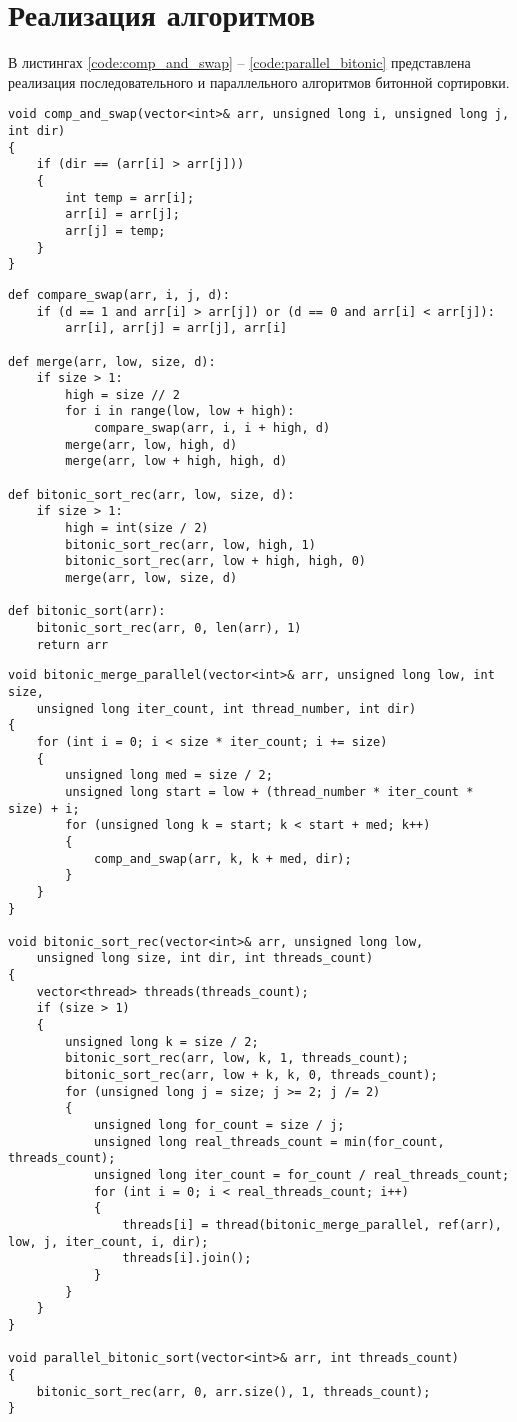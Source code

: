 \section{Реализация алгоритмов}

В листингах \ref{code:comp_and_swap} -- \ref{code:parallel_bitonic} представлена реализация последовательного и параллельного алгоритмов битонной сортировки.

\begin{lstlisting}[label=code:comp_and_swap,caption=Реализация вспомогательной функции обмена значениями элементов в массиве]
void comp_and_swap(vector<int>& arr, unsigned long i, unsigned long j, 
int dir)
{
	if (dir == (arr[i] > arr[j]))
	{
		int temp = arr[i];
		arr[i] = arr[j];
		arr[j] = temp;
	}
}
\end{lstlisting}


\begin{lstlisting}[label=code:bitonic,caption=Реализация последовательного алгоритма битонной сортировки]
def compare_swap(arr, i, j, d):
	if (d == 1 and arr[i] > arr[j]) or (d == 0 and arr[i] < arr[j]):
		arr[i], arr[j] = arr[j], arr[i]

def merge(arr, low, size, d):
	if size > 1:
		high = size // 2
		for i in range(low, low + high):
			compare_swap(arr, i, i + high, d)
		merge(arr, low, high, d)
		merge(arr, low + high, high, d)

def bitonic_sort_rec(arr, low, size, d):
	if size > 1:
		high = int(size / 2)
		bitonic_sort_rec(arr, low, high, 1)
		bitonic_sort_rec(arr, low + high, high, 0)
		merge(arr, low, size, d)

def bitonic_sort(arr):
	bitonic_sort_rec(arr, 0, len(arr), 1)
	return arr
\end{lstlisting}

\begin{lstlisting}[label=code:parallel_bitonic,caption=Реализация параллельного алгоритма битонной сортировки]
void bitonic_merge_parallel(vector<int>& arr, unsigned long low, int size, 
	unsigned long iter_count, int thread_number, int dir)
{
	for (int i = 0; i < size * iter_count; i += size)
	{
		unsigned long med = size / 2;
		unsigned long start = low + (thread_number * iter_count * size) + i;
		for (unsigned long k = start; k < start + med; k++)
		{
			comp_and_swap(arr, k, k + med, dir);
		}
	}
}

void bitonic_sort_rec(vector<int>& arr, unsigned long low, 
	unsigned long size, int dir, int threads_count)
{
	vector<thread> threads(threads_count);
	if (size > 1)
	{
		unsigned long k = size / 2;
		bitonic_sort_rec(arr, low, k, 1, threads_count);
		bitonic_sort_rec(arr, low + k, k, 0, threads_count);
		for (unsigned long j = size; j >= 2; j /= 2)
		{
			unsigned long for_count = size / j;
			unsigned long real_threads_count = min(for_count, threads_count);
			unsigned long iter_count = for_count / real_threads_count;
			for (int i = 0; i < real_threads_count; i++)
			{
				threads[i] = thread(bitonic_merge_parallel, ref(arr), low, j, iter_count, i, dir);
				threads[i].join();
			}
		}
	}
}

void parallel_bitonic_sort(vector<int>& arr, int threads_count)
{
	bitonic_sort_rec(arr, 0, arr.size(), 1, threads_count);
}
\end{lstlisting}

